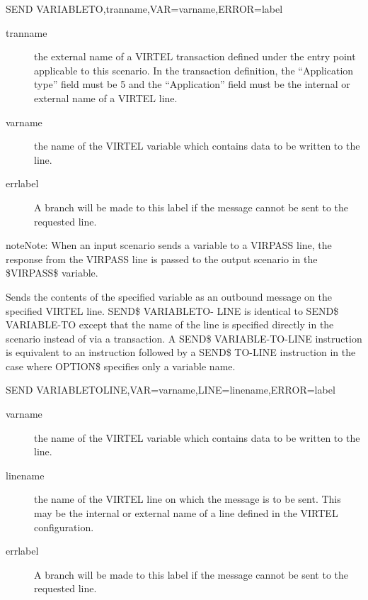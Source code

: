 \documentclass[letterpaper,10pt,english]{sphinxmanual}
\begin{document}
\begin{sphinxVerbatim}[commandchars=\\\{\}]
SEND\PYGZdl{} VARIABLE\PYGZhy{}TO,tranname,VAR=\PYGZsq{}varname\PYGZsq{},ERROR=label
\end{sphinxVerbatim}
\begin{description}
\item[{tranname}] \leavevmode
the external name of a VIRTEL transaction defined under the entry point applicable to this scenario. In the transaction definition, the “Application type” field must be 5 and the “Application” field must be the internal or external name of a VIRTEL line.

\item[{varname}] \leavevmode
the name of the VIRTEL variable which contains data to be written to the line.

\item[{errlabel}] \leavevmode
A branch will be made to this label if the message cannot be sent to the requested line.

\end{description}

\begin{sphinxadmonition}{note}{Note:}
When an input scenario sends a variable to a VIRPASS line, the response from the VIRPASS line is passed to the output scenario in the \$VIRPASS\$ variable.
\end{sphinxadmonition}


Sends the contents of the specified variable as an outbound message on the specified VIRTEL line. SEND\$ VARIABLETO-
LINE is identical to SEND\$ VARIABLE-TO except that the name of the line is specified directly in the scenario instead
of via a transaction. A SEND\$ VARIABLE-TO-LINE instruction is equivalent to an {\hyperref[\detokenize{User_Guide:v457ug-option}]{}} instruction
followed by a SEND\$ TO-LINE instruction in the case where OPTION\$ specifies only a variable name.

\begin{sphinxVerbatim}[commandchars=\\\{\}]
SEND\PYGZdl{} VARIABLE\PYGZhy{}TO\PYGZhy{}LINE,VAR=\PYGZsq{}varname\PYGZsq{},LINE=\PYGZsq{}linename\PYGZsq{},ERROR=label
\end{sphinxVerbatim}
\begin{description}
\item[{varname}] \leavevmode
the name of the VIRTEL variable which contains data to be written to the line.

\item[{linename}] \leavevmode
the name of the VIRTEL line on which the message is to be sent. This may be the internal or external name of a line defined in the VIRTEL configuration.

\item[{errlabel}] \leavevmode
A branch will be made to this label if the message cannot be sent to the requested line.

\end{description}
\end{document}
